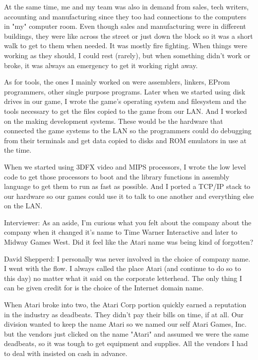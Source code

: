 At the same time, me and my team was also in demand from sales, tech writers, accounting and manufacturing since they too had connections to the computers in "my" computer room. Even though sales and manufacturing were in different buildings, they were like across the street or just down the block so it was a short walk to get to them when needed. It was mostly fire fighting. When things were working as they should, I could rest (rarely), but when something didn't work or broke, it was always an emergency to get it working right away.

As for tools, the ones I mainly worked on were assemblers, linkers, EProm programmers, other single purpose programs. Later when we started using disk drives in our game, I wrote the game's operating system and filesystem and the tools necessary to get the files copied to the game from our LAN. And I worked on the making development systems. These would be the hardware that connected the game systems to the LAN so the programmers could do debugging from their terminals and get data copied to disks and ROM emulators in use at the time. 

When we started using 3DFX video and MIPS processors, I wrote the low level code to get those processors to boot and the library functions in assembly language to get them to run as fast as possible. And I ported a TCP/IP stack to our hardware so our games could use it to talk to one another and everything else on the LAN.

\textcolor{interviewer}{Interviewer:} As an aside, I’m curious what you felt about the company about the company when it changed it’s name to Time Warner Interactive and later to Midway Games West. Did it feel like the Atari name was being kind of forgotten?

\textcolor{interviewee}{David Shepperd:} I personally was never involved in the choice of company name. I went with the flow. I always called the place Atari (and continue to do so to this day) no matter what it said on the corporate letterhead. The only thing I can be given credit for is the choice of the Internet domain name. 

When Atari broke into two, the Atari Corp portion quickly earned a reputation in the industry as deadbeats. They didn't pay their bills on time, if at all. Our division wanted to keep the name Atari so we named our self Atari Games, Inc. but the vendors just clicked on the name "Atari" and assumed we were the same deadbeats, so it was tough to get equipment and supplies. All the vendors I had to deal with insisted on cash in advance. 

